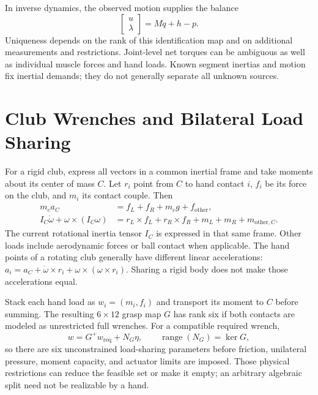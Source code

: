 In inverse dynamics, the observed motion supplies the balance
\begin{equation}
 [B\;J_c^T]\begin{bmatrix}u\\\lambda\end{bmatrix}
 =M\ddot q+h-p.
 \label{eq:inverse_loop_balance}
\end{equation}
Uniqueness depends on the rank of this identification map and on additional
measurements and restrictions. Joint-level net torques can be ambiguous as well
as individual muscle forces and hand loads. Known segment inertias and motion
fix inertial demands; they do not generally separate all unknown sources.

\section{Club Wrenches and Bilateral Load Sharing}
\label{sec:loop_ambiguity_active}

For a rigid club, express all vectors in a common inertial frame and take moments
about its center of mass $C$. Let $r_i$ point from $C$ to hand contact $i$, $f_i$
be its force on the club, and $m_i$ its contact couple. Then
\begin{equation}
 \begin{aligned}
 m_c a_C &= f_L+f_R+m_c g+f_{\mathrm{other}},\\
 I_C\dot\omega+\omega\times(I_C\omega)
 &=r_L\times f_L+r_R\times f_R+m_L+m_R+m_{\mathrm{other},C}.
 \end{aligned}
 \label{eq:club_total_force}
\end{equation}
The current rotational inertia tensor $I_C$ is expressed in that same frame. Other
loads include aerodynamic forces or ball contact when applicable. The hand
points of a rotating club generally have different linear accelerations:
$a_i=a_C+\dot\omega\times r_i+\omega\times(\omega\times r_i)$.
Sharing a rigid body does not make those accelerations equal.

Stack each hand load as $w_i=(m_i,f_i)$ and transport its moment to $C$ before
summing. The resulting $6\times12$ grasp map $G$ has rank six if both contacts
are modeled as unrestricted full wrenches. For a compatible required wrench,
\begin{equation}
 w=G^+w_{\mathrm{req}}+N_G\eta,\qquad
 \operatorname{range}(N_G)=\ker G,
 \label{eq:force_decomposition_ambiguous}
\end{equation}
so there are six unconstrained load-sharing parameters before friction,
unilateral pressure, moment capacity, and actuator limits are imposed. Those
physical restrictions can reduce the feasible set or make it empty; an arbitrary
algebraic split need not be realizable by a hand.

